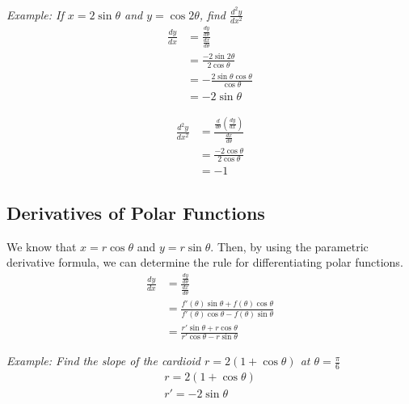 \documentclass{article}
\begin{document}
            \noindent \color{blue} \textit{Example: If $x=2\sin{\theta}$ and $y=\cos{2\theta}$,
            find $\frac{d^2y}{dx^2}$} \color{black} \\

            \begin{align*}
                \frac{dy}{dx} &= \frac{\frac{dy}{d\theta}}{\frac{dx}{d\theta}} \\
                &= \frac{-2\sin{2\theta}}{2\cos{\theta}} \\
                &= -\frac{2\sin\theta\cos\theta}{\cos\theta} \\
                &= -2\sin\theta
            \end{align*}

            \begin{align*}
                \frac{d^2y}{dx^2} &= \frac{\frac{d}{d\theta}\left(\frac{dy}{dx}\right)}{\frac{dx}{d\theta}} \\
                &= \frac{-2\cos\theta}{2\cos\theta} \\
                &= -1
            \end{align*}



        \subsection{Derivatives of Polar Functions}
            We know that $x=r\cos\theta$ and $y=r\sin\theta$. Then, by using the parametric derivative
            formula, we can determine the rule for differentiating polar functions. \\

            \begin{align*}
                \frac{dy}{dx} &= \frac{\frac{dy}{d\theta}}{\frac{dx}{d\theta}} \\
                &= \frac{f'(\theta)\sin\theta+f(\theta)\cos\theta}{f'(\theta)\cos\theta-f(\theta)\sin\theta} \\
                &= \frac{r'\sin\theta+r\cos\theta}{r'\cos\theta-r\sin\theta}
            \end{align*}

            \noindent \color{blue} \textit{Example: Find the slope of the cardioid
            $r=2(1+\cos\theta)$ at $\theta=\frac{\pi}{6}$} \color{black} \\

            \begin{align*}
                r=2(1+\cos\theta) \\
                r' = -2\sin\theta
            \end{align*}
\end{document}
